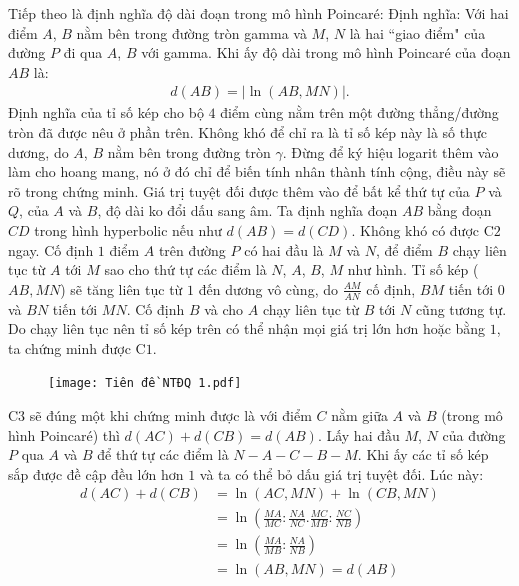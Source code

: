 \begin{multicols}{2}
	\vskip 0.1cm
	Tiếp theo là định nghĩa độ dài đoạn trong mô hình Poincaré:
	\vskip 0.1cm
	Định nghĩa: Với hai điểm $A$, $B$ nằm bên trong đường tròn gamma và $M$, $N$ là hai ``giao điểm" của đường $P$ đi qua $A$, $B$ với gamma. Khi ấy độ dài trong mô hình Poincaré của đoạn $AB$ là:
	\begin{align*}
		 d(AB) = |\ln{(AB, MN)}|.
	\end{align*} 
	Định nghĩa của tỉ số kép cho bộ $4$ điểm cùng nằm trên một đường thẳng/đường tròn đã được nêu ở phần trên. Không khó để chỉ ra là tỉ số kép này là số thực dương, do $A$, $B$ nằm bên trong đường tròn $\gamma$. Đừng để ký hiệu logarit thêm vào làm cho hoang mang, nó ở đó chỉ để biến tính nhân thành tính cộng, điều này sẽ rõ trong chứng minh. Giá trị tuyệt đối được thêm vào để bất kể thứ tự của $P$ và $Q$, của $A$ và $B$, độ dài ko đổi dấu sang âm.
	\vskip 0.1cm
	Ta định nghĩa đoạn $AB$ bằng đoạn $CD$ trong hình hyperbolic nếu như $d(AB) = d(CD)$. Không khó có được C$2$ ngay. 
	Cố định $1$ điểm $A$ trên đường $P$ có hai đầu là $M$ và $N$, để điểm $B$ chạy liên tục từ $A$ tới $M$ sao cho thứ tự các điểm là $N$, $A$, $B$, $M$ như hình. Tỉ số kép ($AB, MN$) sẽ tăng liên tục từ $1$ đến dương vô cùng, do $\frac{AM}{AN}$ cố định, $BM$ tiến tới $0$ và $BN$ tiến tới $MN$. Cố định $B$ và cho $A$ chạy liên tục từ $B$ tới $N$ cũng tương tự. Do chạy liên tục nên tỉ số kép trên có thể nhận mọi giá trị lớn hơn hoặc bằng $1$, ta chứng minh được C$1$. 
	\begin{figure}[H]
		\vspace*{-5pt}
		\centering
		\captionsetup{labelformat= empty, justification=centering}
		\texttt{[image: Tiên đề NTĐQ 1.pdf]}
		\vspace*{-10pt}
	\end{figure}
	C$3$ sẽ đúng một khi chứng minh được là với điểm $C$ nằm giữa $A$ và $B$ (trong mô hình Poincaré) thì $d(AC) + d(CB) = d(AB)$. Lấy hai đầu $M$, $N$ của đường $P$ qua $A$ và $B$ để thứ tự các điểm là $N - A - C - B - M$.
	\vskip 0.1cm
	Khi ấy các tỉ số kép sắp được đề cập đều lớn hơn $1$ và ta có thể bỏ dấu giá trị tuyệt đối. Lúc này:
	\begin{align*}
		d(AC) \!+\! d(CB) &= \ln{(AC, MN)} \!+\! \ln{(CB, MN)} \\
		&= \ln{\left(\frac{MA}{MC} \!:\! \frac{NA}{NC} . \frac{MC}{MB} \!:\! \frac{NC}{NB} \right)} \\
		&= \ln{ \left(\frac{MA}{MB} : \frac{NA}{NB}\right)} \\
		&= \ln{(AB, MN)} = d(AB)

\end{align*}
\end{multicols}
